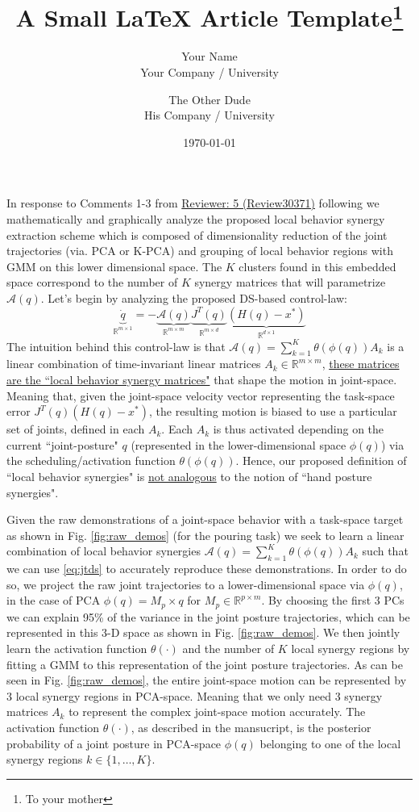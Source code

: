 \documentclass{article}
\title{A Small \LaTeX{} Article Template\thanks{To your mother}}
\author{Your Name  \\
	Your Company / University  \\
	\and 
	The Other Dude \\
	His Company / University \\
	}
\date{\today}
\begin{document}
\vspace{-10pt}
In response to Comments 1-3 from \underline{Reviewer: 5 (Review30371)} following we mathematically and graphically analyze the proposed local behavior synergy extraction scheme which is composed of dimensionality reduction of the joint trajectories (via. PCA or K-PCA) and grouping of local behavior regions with GMM on this lower dimensional space. The $K$ clusters found in this embedded space correspond to the number of $K$ synergy matrices that will parametrize $\mathcal{A}(q)$. Let's begin by analyzing the proposed DS-based control-law:
\begin{equation}
\underbrace{\dot{q}}_{\mathbb{R}^{m\times 1}} = -\underbrace{\mathcal{A}(q)}_{\mathbb{R}^{m\times m}}\underbrace{J^{T}(q)}_{\mathbb{R}^{m\times d}}\underbrace{(H(q)-x^*)}_{\mathbb{R}^{d\times 1}}
\label{eq:jtds}
\end{equation}
The intuition behind this control-law is that $\mathcal{A}(q) = \sum\limits_{k=1}^{K}\theta(\phi(q))A_k$ is a linear combination of time-invariant linear matrices $A_k \in \mathbb{R}^{m \times m}$, \underline{these matrices are the ``local behavior synergy matrices"} that shape the motion in joint-space. Meaning that, given the joint-space velocity vector representing the task-space error $J^{T}(q)(H(q)-x^*)$, the resulting motion is biased to use a particular set of joints, defined in each $A_k$. Each $A_k$ is thus activated depending on the current ``joint-posture" $q$ (represented in the lower-dimensional space $\phi(q)$) via the scheduling/activation function $\theta(\phi(q))$. Hence, our proposed definition of ``local behavior synergies" is \underline{not analogous} to the notion of ``hand posture synergies". 

Given the raw demonstrations of a joint-space  behavior with a task-space target as shown in Fig. \ref{fig:raw_demos} (for the pouring task) we seek to learn a linear combination of local behavior synergies $\mathcal{A}(q) = \sum\limits_{k=1}^{K}\theta(\phi(q))A_k$ such that we can use \eqref{eq:jtds} to accurately reproduce these demonstrations. In order to do so, we project the raw joint trajectories to a lower-dimensional space via $\phi(q)$, in the case of PCA $\phi(q)=M_p \times q$ for $M_p \in \mathbb{R}^{p \times m}$. By choosing the first 3 PCs we can explain 95\% of the variance in the joint posture trajectories, which can be represented in this 3-D space as shown in Fig. \ref{fig:raw_demos}. We then jointly learn the activation function $\theta(\cdot)$ and the number of $K$ local synergy regions by fitting a GMM to this representation of the joint posture trajectories. As can be seen in Fig. \ref{fig:raw_demos}, the entire joint-space motion can be represented by 3 local synergy regions in PCA-space. Meaning that we only need 3 synergy matrices $A_k$ to represent the complex joint-space motion accurately. The activation function $\theta(\cdot)$, as described in the mansucript, is the posterior probability of a joint posture in PCA-space $\phi(q)$ belonging to one of the local synergy regions $k \in \{1,\dots,K\}$.
\end{document}
